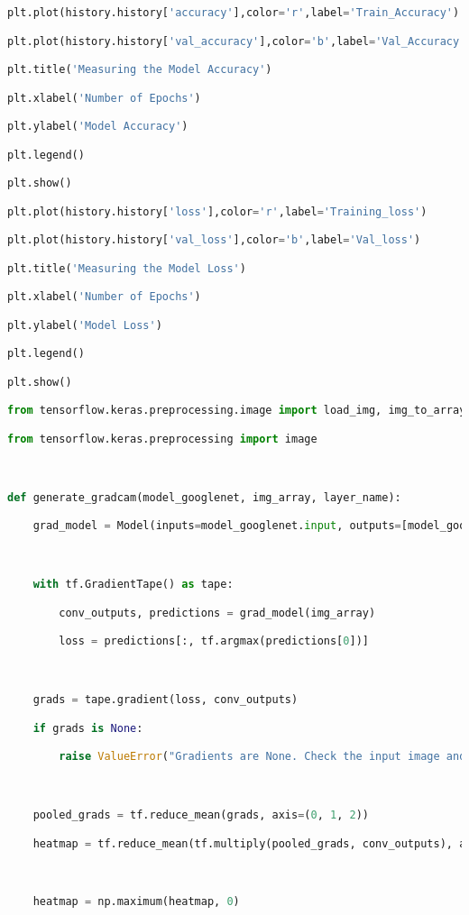 \documentclass{article}
\begin{document}
\begin{lstlisting}[style=mystyle,language=Python]
plt.plot(history.history['accuracy'],color='r',label='Train_Accuracy')

plt.plot(history.history['val_accuracy'],color='b',label='Val_Accuracy')

plt.title('Measuring the Model Accuracy')

plt.xlabel('Number of Epochs')

plt.ylabel('Model Accuracy')

plt.legend()

plt.show()

plt.plot(history.history['loss'],color='r',label='Training_loss')

plt.plot(history.history['val_loss'],color='b',label='Val_loss')

plt.title('Measuring the Model Loss')

plt.xlabel('Number of Epochs')

plt.ylabel('Model Loss')

plt.legend()

plt.show()

from tensorflow.keras.preprocessing.image import load_img, img_to_array

from tensorflow.keras.preprocessing import image



def generate_gradcam(model_googlenet, img_array, layer_name):

    grad_model = Model(inputs=model_googlenet.input, outputs=[model_googlenet.get_layer(layer_name).output, model_googlenet.output])



    with tf.GradientTape() as tape:

        conv_outputs, predictions = grad_model(img_array)

        loss = predictions[:, tf.argmax(predictions[0])]



    grads = tape.gradient(loss, conv_outputs)

    if grads is None:

        raise ValueError("Gradients are None. Check the input image and model.")



    pooled_grads = tf.reduce_mean(grads, axis=(0, 1, 2))

    heatmap = tf.reduce_mean(tf.multiply(pooled_grads, conv_outputs), axis=-1)



    heatmap = np.maximum(heatmap, 0)


\end{lstlisting}
\end{document}
